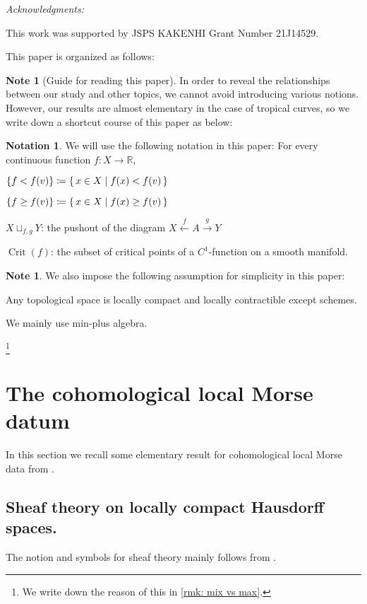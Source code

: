 \documentclass[a4paper,dvipdfmx,reqno,12pt]{amsart}
\theoremstyle{definition}
\newtheorem{Note}[Thm]{Note}
\newtheorem{Not}[Thm]{Notation}
\newcommand{\deq}{\coloneqq}
\newcommand{\R}{\mathbb{R}}%
\newcommand{\opn}[1]{\operatorname{#1}}
\newcommand{\xto}[1]{\xrightarrow{#1}}
\newcommand{\xgets}[1]{\xleftarrow{#1}}
\numberwithin{equation}{section}
\begin{document}
\textit{Acknowledgments:}

This work was supported by JSPS KAKENHI 
Grant Number 21J14529.

This paper is organized as follows:

\begin{Note}[Guide for reading this paper]
  In order to reveal the relationships between our study
  and other topics, we cannot avoid introducing various
  notions. However, our results are almost elementary
in the case of tropical curves,
  so we write down a shortcut course of this paper as below:
\end{Note}

\begin{Not}

  We will use the following notation in this paper:
  For every continuous function $f\colon X\to \R$,

  $\{f<f(v)\}\deq \set{x\in X\mid f(x)< f(v)}$

  $\{f\geq f(v)\}\deq \set{x\in X\mid f(x)\geq f(v)}$

  $X\sqcup_{f,g}Y$: the pushout of the diagram
  $X\xgets{f} A\xto{g} Y$

  $\opn{Crit}(f)$: the subset of critical points of a
  $C^{1}$-function on a smooth manifold.
\end{Not}

\begin{Note}
  We also impose the following assumption for simplicity in this paper:

  Any topological space is locally compact and locally
  contractible except schemes.


  We mainly use min-plus algebra.

  \footnote{We write down the reason of this in \cref{rmk: mix vs max}.}


\end{Note}

\section{The cohomological local Morse datum}
In this section we recall some elementary result
for cohomological local Morse data from
\cite{MR2031639,MR1299726,MR4294126}.

\subsection{Sheaf theory on locally compact 
Hausdorff spaces.}
\cite{MR1299726,MR1269324,MR2050072}
The notion and symbols for 
sheaf theory mainly follows from \cite{MR1299726}.
\end{document}
